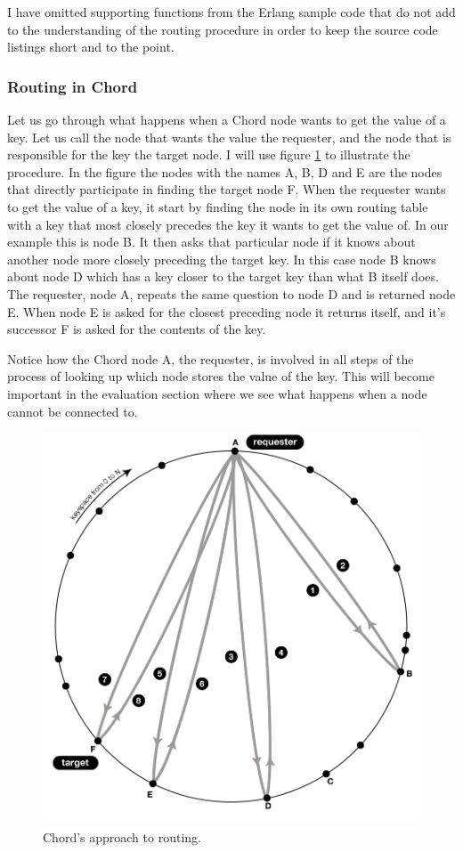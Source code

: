 I have omitted supporting functions from the Erlang sample code that do not add to the understanding of the routing procedure in order to keep the source code listings short and to the point.

\subsubsection{Routing in Chord}
Let us go through what happens when a Chord node wants to get the value of a key. Let us call the node that wants the value the requester, and the node that is responsible for the key the target node. I will use figure \ref{figRoutingChord} to illustrate the procedure. In the figure the nodes with the names A, B, D and E are the nodes that directly participate in finding the target node F.
When the requester wants to get the value of a key, it start by finding the node in its own routing table with a key that most closely precedes the key it wants to get the value of. In our example this is node B. It then asks that particular node if it knows about another node more closely preceding the target key. In this case node B knows about node D which has a key closer to the target key than what B itself does. The requester, node A, repeats the same question to node D and is returned node E. When node E is asked for the closest preceding node it returns itself, and it's successor F is asked for the contents of the key.

Notice how the Chord node A, the requester, is involved in all steps of the process of looking up which node stores the value of the key. This will become important in the evaluation section where we see what happens when a node cannot be connected to.

\begin{figure}[!htb]
\begin{center}
	\includegraphics[width=0.9\linewidth]{illustrations/ChordRoutingSuccess.png}
  \caption{Chord's approach to routing.}
  \label{figRoutingChord}
\end{center}
\end{figure}

